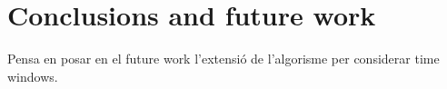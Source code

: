 \chapter{Conclusions and future work}\label{chapter:conclusion}


Pensa en posar en el future work l'extensió de l'algorisme per considerar time windows.

